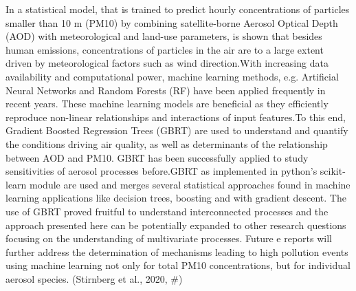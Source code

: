 In a statistical model, that is trained to predict hourly concentrations of particles smaller than 10 m (PM10) by combining satellite-borne Aerosol Optical Depth (AOD) with meteorological and land-use parameters, is shown that besides human emissions, concentrations of particles in the air are to a large extent driven by meteorological factors such as wind direction.With increasing data availability and computational power, machine learning methods, e.g. Artificial Neural Networks  and Random Forests (RF) have been applied frequently in recent years. These machine learning models are beneficial as they efficiently reproduce non-linear relationships and interactions of input features.To this end, Gradient Boosted Regression Trees (GBRT) are used to understand and quantify the conditions driving air quality, as well as determinants of the relationship between AOD and PM10. GBRT has been successfully applied to study sensitivities of aerosol processes before.GBRT as implemented in python’s scikit-learn module are used and merges several statistical approaches found in machine learning applications like decision trees, boosting and with gradient descent. The use of GBRT proved fruitful to understand interconnected processes and the approach presented here can be potentially expanded to other research questions focusing on the understanding of multivariate processes. Future e reports will further address the determination of mechanisms leading to high pollution events using machine learning not only for total PM10 concentrations, but for individual aerosol species. (Stirnberg et al., 2020, #)

